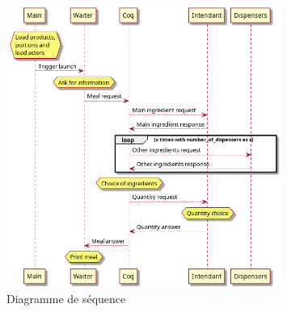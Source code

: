 \vfill
\begin{figure}[H]
    \centering
    \includegraphics[width=0.8\textwidth]{parts/pics/diagram.png}
    \caption{Diagramme de séquence}
    \label{fig:my_label}
\end{figure}